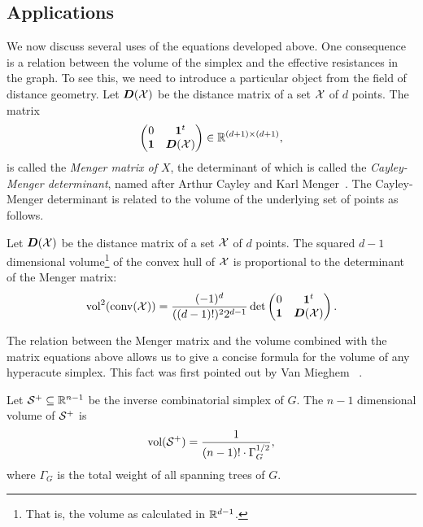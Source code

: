 \subsection{Applications}
We now discuss several  uses of the equations developed above. 
One consequence is a relation between the volume of the simplex and the effective resistances in the graph. To see this, we need to introduce a particular object from the field of distance geometry. Let $\vb*{D}(\mathcal{X})$ be the distance matrix of a set $\mathcal{X}$ of $d$ points. The matrix 
\begin{equation}
\label{eq:menger_matrix}
\begin{pmatrix}
0 & \vb{1}^t \\
\vb{1} & \vb*{D}(\mathcal{X})
\end{pmatrix}\in\mathbb{R}^{(d+1)\times (d+1)},
\end{equation}
is called the \emph{Menger matrix of $X$}, the determinant of which is called the \emph{Cayley-Menger determinant}, named after Arthur Cayley and Karl Menger~\cite{cayley1841theorem, Menger1928}. The Cayley-Menger determinant is related to the volume of the underlying set of points as follows. 


\begin{lemma}
	\label{lem:menger_volume}
	Let $\vb*{D}(\mathcal{X})$ be the distance matrix of a set $\mathcal{X}$ of $d$ points. The squared $d-1$ dimensional volume\footnote{That is, the volume as calculated in $\mathbb{R}^{d-1}$.} of the convex hull of $\mathcal{X}$ is proportional to the  determinant of the Menger matrix: 
	\begin{equation}
	\label{eq:vol(convX)}
	\textnormal{vol}^2(\textnormal{conv}(\mathcal{X})) = \frac{(-1)^d}{((d-1)!)^2 2^{d-1}} \det\begin{pmatrix}
	0 & \vb{1}^t \\
	\vb{1} & \vb*{D}(\mathcal{X})
	\end{pmatrix}.
	\end{equation} 
\end{lemma}

The relation between the Menger matrix and the volume combined with the matrix equations above allows us to give a concise formula for the volume of any hyperacute simplex. 
This fact  was first pointed out by Van Mieghem \etal~\cite{van2017pseudoinverse}. 

\begin{lemma}
	\label{lem:volume}
	Let $\mathcal{S}^+\subseteq\mathbb{R}^{n-1}$ be the inverse combinatorial simplex of $G$. The  $n-1$ dimensional volume of $\mathcal{S}^+$ is
	\begin{equation}
	\label{eq:vol(T)}
	\textnormal{vol}(\mathcal{S}^+) = \frac{1}{(n-1)!\cdot \Gamma_G^{1/2}},
	\end{equation}
	where $\Gamma_G$ is the total weight of all spanning  trees of $G$. 
\end{lemma}

